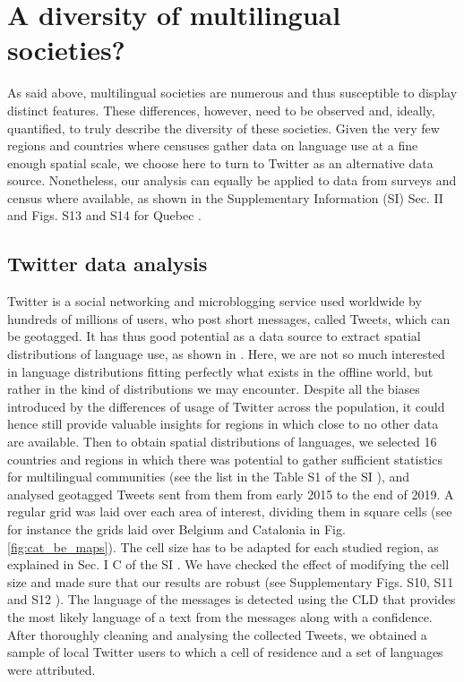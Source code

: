 \documentclass[../thesis.tex]{subfiles}
\begin{document}
\section{A diversity of multilingual societies?}
As said above, multilingual societies are numerous and thus susceptible to display
distinct features. These differences, however, need to be observed and, ideally,
quantified, to truly describe the diversity of these societies. Given the very few
regions and countries where censuses gather data on language use at a fine enough
spatial scale, we choose here to turn to Twitter as an alternative data source.
Nonetheless, our analysis can equally be applied to data from surveys and census where
available, as shown in the Supplementary Information (SI) Sec. II and Figs. S13 and S14
for Quebec \cite{supp}.


\subsection{Twitter data analysis}
Twitter is a social networking and microblogging service used worldwide by hundreds of
millions of users, who post short messages, called Tweets, which can be geotagged. It
has thus good potential as a data source to extract spatial distributions of language
use, as shown in
\cite{MocanuTwitterBabel2013,PavalanathanConfoundsConsequences2015,GoncalvesCrowdsourcingDialect2014,HuangUnderstandingRegional2016,GoncalvesMappingAmericanization2018,DunnMappingLanguages2020}.
Here, we are not so much interested in language distributions fitting perfectly what
exists in the offline world, but rather in the kind of distributions we may encounter.
Despite all the biases introduced by the differences of usage of Twitter across the
population, it could hence still provide valuable insights for regions in which close to
no other data are available. Then to obtain spatial distributions of languages, we
selected 16 countries and regions in which there was potential to gather sufficient
statistics for multilingual communities (see the list in the Table S1 of the SI
\cite{supp}), and analysed geotagged Tweets sent from them from early 2015 to the end
of 2019. A regular grid was laid over each area of interest, dividing them in square
cells (see for instance the grids laid over Belgium and Catalonia in Fig.
\cref{fig:cat_be_maps}). The cell size has to be adapted for each studied region, as
explained in Sec. I C of the SI \cite{supp}. We have checked the effect of modifying the
cell size and made sure that our results are robust (see Supplementary Figs. S10, S11
and S12 \cite{supp}). The language of the messages is detected using the \ac{CLD} that
provides the most likely language of a text from the messages along with a confidence.
After thoroughly cleaning and analysing the collected Tweets, we obtained a sample of
local Twitter users to which a cell of residence and a set of languages were attributed.
\end{document}
